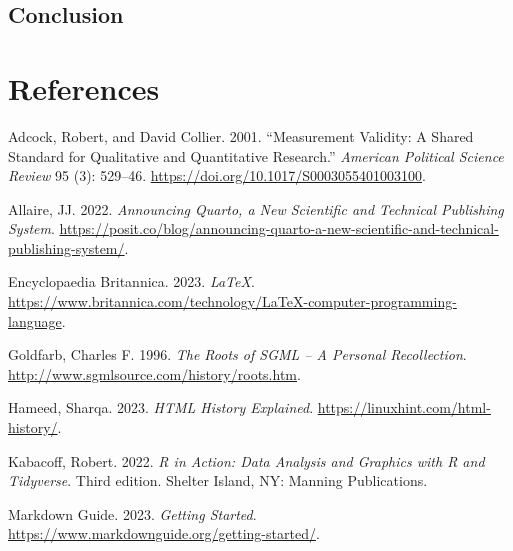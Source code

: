 \documentclass[
  letterpaper,
]{scrbook}
\newlength{\cslhangindent}
\newlength{\cslentryspacingunit} %
\newenvironment{CSLReferences}[2] %
 {%
  \setlength{\parindent}{0pt}
  \ifodd #1
  \let\oldpar\par
  \def\par{\hangindent=\cslhangindent\oldpar}
  \fi
  \setlength{\parskip}{#2\cslentryspacingunit}
 }%
 {}
\begin{document}
\hypertarget{conclusion-3}{%
\section{Conclusion}\label{conclusion-3}}


\hypertarget{references}{%
\chapter*{References}\label{references}}


\hypertarget{refs}{}
\begin{CSLReferences}{1}{0}
\leavevmode{}%
Adcock, Robert, and David Collier. 2001. {``Measurement {Validity}: {A
Shared Standard} for {Qualitative} and {Quantitative Research}.''}
\emph{American Political Science Review} 95 (3): 529--46.
\url{https://doi.org/10.1017/S0003055401003100}.

\leavevmode{}%
Allaire, JJ. 2022. \emph{Announcing {Quarto}, a New Scientific and
Technical Publishing System}.
\url{https://posit.co/blog/announcing-quarto-a-new-scientific-and-technical-publishing-system/}.

\leavevmode{}%
Encyclopaedia Britannica. 2023. \emph{{LaTeX}}.
\url{https://www.britannica.com/technology/LaTeX-computer-programming-language}.

\leavevmode{}%
Goldfarb, Charles F. 1996. \emph{The {Roots} of {SGML} -- {A Personal
Recollection}}. \url{http://www.sgmlsource.com/history/roots.htm}.

\leavevmode{}%
Hameed, Sharqa. 2023. \emph{{HTML History} \textbar{} {Explained}}.
\url{https://linuxhint.com/html-history/}.

\leavevmode{}%
Kabacoff, Robert. 2022. \emph{R in Action: Data Analysis and Graphics
with {R} and {Tidyverse}}. Third edition. {Shelter Island, NY}: {Manning
Publications}.

\leavevmode{}%
Markdown Guide. 2023. \emph{Getting {Started}}.
\url{https://www.markdownguide.org/getting-started/}.


\end{CSLReferences}
\end{document}

